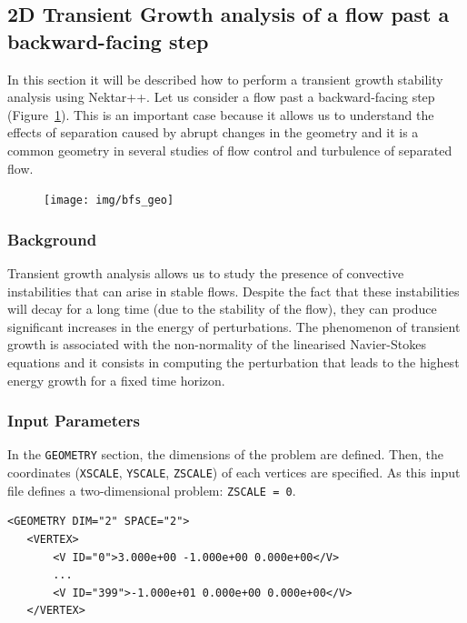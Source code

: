 \subsection{2D Transient Growth analysis of a flow past a backward-facing step}

In this section it will be described how to perform a transient growth stability analysis using Nektar++. Let us consider a flow past a backward-facing step (Figure~\ref{bfs_geo}). This is an important case because it allows us to understand  the effects of separation caused by abrupt changes in the geometry and it is a common geometry in several studies of flow control and turbulence of separated flow.

\begin{figure}[!htbp]
\centering
 {\texttt{[image: img/bfs\_geo]}}
    \caption {}\label{bfs_geo}
\end{figure}

\subsubsection{Background}

Transient growth analysis allows us to study the presence of convective instabilities that can arise in stable flows. Despite the fact that these instabilities will decay for a long time (due to the stability of the flow), they can produce significant increases in the energy of perturbations. The phenomenon of transient growth is associated with the non-normality of the linearised Navier-Stokes equations and it consists in computing the perturbation that leads to the highest energy growth for a fixed time horizon.

\subsubsection{Input Parameters}

In the \texttt{GEOMETRY} section, the dimensions of the problem are defined. Then, the coordinates (\texttt{XSCALE}, \texttt{YSCALE}, \texttt{ZSCALE}) of each vertices are specified. As this input file defines a two-dimensional problem: \texttt{ZSCALE = 0}.

      \begin{lstlisting}[style=XMLStyle]
<GEOMETRY DIM="2" SPACE="2">
   <VERTEX>
       <V ID="0">3.000e+00 -1.000e+00 0.000e+00</V>
       ...
       <V ID="399">-1.000e+01 0.000e+00 0.000e+00</V>
   </VERTEX>
     \end{lstlisting}


